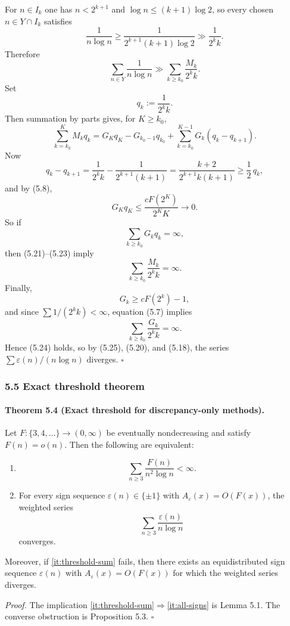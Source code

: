 For $n\in I_k$ one has $n<2^{k+1}$ and $\log n\le (k+1)\log 2$, so every chosen $n\in Y\cap I_k$ satisfies
\[
\frac{1}{n\log n}
\ge \frac{1}{2^{k+1}(k+1)\log 2}
\gg \frac{1}{2^k k}.
\tag{5.19}
\]
Therefore
\[
\sum_{n\in Y}\frac{1}{n\log n}
\gg \sum_{k\ge k_0}\frac{M_k}{2^k k}.
\tag{5.20}
\]
Set
\[
q_k:=\frac{1}{2^k k}.
\]
Then summation by parts gives, for $K\ge k_0$,
\[
\sum_{k=k_0}^{K} M_k q_k
=
G_K q_K - G_{k_0-1}q_{k_0} + \sum_{k=k_0}^{K-1} G_k(q_k-q_{k+1}).
\tag{5.21}
\]
Now
\[
q_k-q_{k+1}
= \frac{1}{2^k k}-\frac{1}{2^{k+1}(k+1)}
= \frac{k+2}{2^{k+1}k(k+1)}
\ge \frac12\,q_k,
\tag{5.22}
\]
and by (5.8),
\[
G_K q_K \le \frac{cF(2^K)}{2^K K}\to 0.
\tag{5.23}
\]
So if
\[
\sum_{k\ge k_0} G_k q_k = \infty,
\tag{5.24}
\]
then (5.21)--(5.23) imply
\[
\sum_{k\ge k_0}\frac{M_k}{2^k k}=\infty.
\tag{5.25}
\]
Finally,
\[
G_k \ge cF(2^k)-1,
\tag{5.26}
\]
and since $\sum 1/(2^k k)<\infty$, equation (5.7) implies
\[
\sum_{k\ge k_0}\frac{G_k}{2^k k}=\infty.
\tag{5.27}
\]
Hence (5.24) holds, so by (5.25), (5.20), and (5.18), the series $\sum \varepsilon(n)/(n\log n)$ diverges.
\hfill$\square$

\subsubsection{5.5 Exact threshold theorem}

\paragraph{Theorem 5.4 (Exact threshold for discrepancy-only methods).}
Let $F:\{3,4,\dots\}\to (0,\infty)$ be eventually nondecreasing and satisfy $F(n)=o(n)$.  Then the following are equivalent:
\begin{enumerate}
\item \label{it:threshold-sum}
\[
\sum_{n\ge 3}\frac{F(n)}{n^2\log n}<\infty.
\]
\item \label{it:all-signs}
For every sign sequence $\varepsilon(n)\in\{\pm 1\}$ with $A_\varepsilon(x)=O(F(x))$, the weighted series
\[
\sum_{n\ge 3}\frac{\varepsilon(n)}{n\log n}
\]
converges.
\end{enumerate}
Moreover, if \ref{it:threshold-sum} fails, then there exists an equidistributed sign sequence $\varepsilon(n)$ with $A_\varepsilon(x)=O(F(x))$ for which the weighted series diverges.


\emph{Proof.}
The implication \ref{it:threshold-sum}$\Rightarrow$\ref{it:all-signs} is Lemma 5.1.  The converse obstruction is Proposition 5.3.
\hfill$\square$

